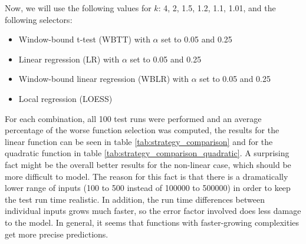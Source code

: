 Now, we will use the following values for $k$: 4, 2, 1.5, 1.2, 1.1, 1.01, and the following selectors:
\begin{itemize}
	\item Window-bound t-test (WBTT) with $\alpha$ set to 0.05 and 0.25
	\item Linear regression (LR) with $\alpha$ set to 0.05 and 0.25
	\item Window-bound linear regression (WBLR) with $\alpha$ set to 0.05 and 0.25
	\item Local regression (LOESS)
\end{itemize}

For each combination, all 100 test runs were performed and an average percentage of the worse function selection was computed, the results for the linear function can be seen in table \ref{tab:strategy_comparison} and for the quadratic function in table \ref{tab:strategy_comparison_quadratic}. A surprising fact might be the overall better results for the non-linear case, which should be more difficult to model. The reason for this fact is that there is a dramatically lower range of inputs (100 to 500 instead of 100000 to 500000) in order to keep the test run time realistic. In addition, the run time differences between individual inputs grows much faster, so the error factor involved does less damage to the model. In general, it seems that functions with faster-growing complexities get more precise predictions.


